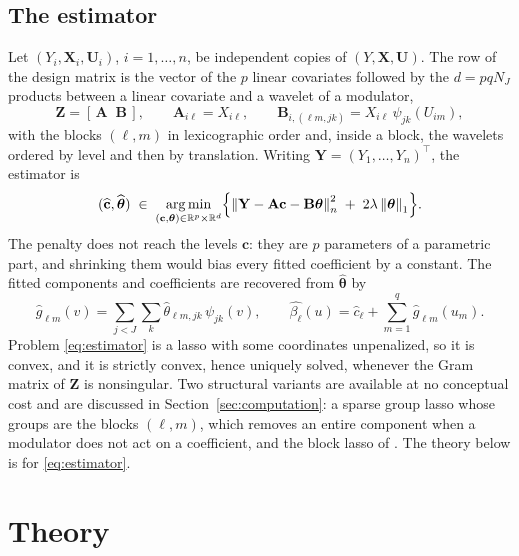 \documentclass[12pt]{article} %
\theoremstyle{definition}
\newcommand{\R}{\mathbb{R}}
\newcommand{\T}{^{\top}}
\newcommand{\norm}[1]{\left\lVert #1 \right\rVert}
\newcommand{\normn}[1]{\left\lVert #1 \right\rVert_{n}}
\newcommand{\cv}{\ell}
\newcommand{\md}{m}
\newcommand{\lev}{j}
\newcommand{\tsl}{k}
\newcommand{\NJ}{N_{J}}
\newcommand{\bX}{\mathbf{X}}
\newcommand{\bU}{\mathbf{U}}
\newcommand{\bZ}{\mathbf{Z}}
\newcommand{\fcoef}[1]{\beta_{#1}}
\newcommand{\wav}[2]{\psi_{#1#2}}
\newcommand{\btheta}{\boldsymbol{\theta}}
\newcommand{\thetahat}{\widehat{\btheta}}
\newcommand{\bc}{\mathbf{c}}
\newcommand{\chat}{\widehat{\mathbf{c}}}
\newcommand{\pen}{\lambda}
\newcommand{\Amat}{\mathbf{A}}
\newcommand{\Bmat}{\mathbf{B}}
\newcommand{\bY}{\mathbf{Y}}
\begin{document}
\subsection{The estimator}
\label{sec:estimator}

Let $(Y_i,\bX_i,\bU_i)$, $i = 1,\dots,n$, be independent copies of
$(Y,\bX,\bU)$. The row of the design matrix is the vector of the $p$ linear
covariates followed by the $d = pq\NJ$ products between a linear covariate and
a wavelet of a modulator,
\begin{equation}
  \label{eq:design}
  \bZ = [\,\Amat \;\; \Bmat\,], \qquad
  \Amat_{i\cv} = X_{i\cv}, \qquad
  \Bmat_{i,(\cv\md,\lev\tsl)} = X_{i\cv}\,\wav{\lev}{\tsl}(U_{i\md}),
\end{equation}
with the blocks $(\cv,\md)$ in lexicographic order and, inside a block, the
wavelets ordered by level and then by translation. Writing
$\bY = (Y_1,\dots,Y_n)\T$, the estimator is
\begin{equation}
  \label{eq:estimator}
  (\chat,\thetahat) \;\in\; \mathop{\rm arg\,min}_{(\bc,\btheta)\in
  \R^{p}\times\R^{d}}
  \Bigl\{\normn{\bY - \Amat\bc - \Bmat\btheta}^{2}
  \;+\; 2\pen\norm{\btheta}_{1}\Bigr\} .
\end{equation}
The penalty does not reach the levels $\bc$: they are $p$ parameters of a
parametric part, and shrinking them would bias every fitted coefficient by a
constant. The fitted components and coefficients are recovered from
$\thetahat$ by
\[
  \widehat{g}_{\cv\md}(v) = \sum_{\lev<J}\sum_{\tsl}
  \widehat{\theta}_{\cv\md,\lev\tsl}\,\wav{\lev}{\tsl}(v),
  \qquad
  \widehat{\fcoef{\cv}}(u) = \widehat{c}_{\cv}
  + \sum_{\md=1}^{q}\widehat{g}_{\cv\md}(u_{\md}).
\]
Problem \eqref{eq:estimator} is a lasso with some coordinates unpenalized, so
it is convex, and it is strictly convex, hence uniquely solved, whenever the
Gram matrix of $\bZ$ is nonsingular. Two structural variants are available at
no conceptual cost and are discussed in Section~\ref{sec:computation}: a
sparse group lasso \citep{Simon-Friedman-Hastie-Tibshirani-2013} whose groups
are the blocks $(\cv,\md)$, which removes an entire component when a modulator
does not act on a coefficient, and the block lasso of
\citet{Klopp-Pensky-2015}. The theory below is for \eqref{eq:estimator}.

\section{Theory}
\label{sec:theory}
\end{document}
